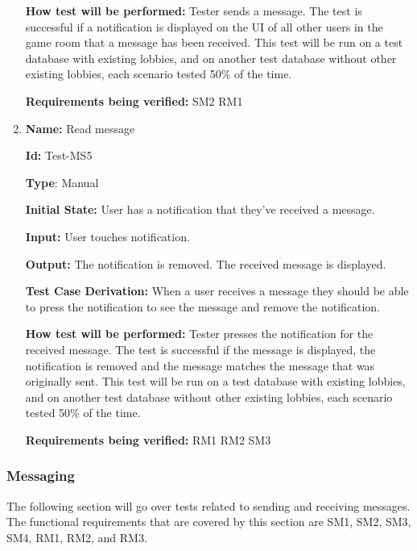 \documentclass[12pt, titlepage]{article}
\begin{document}
\begin{enumerate}
\textbf{How test will be performed:}
Tester sends a message. The test is successful if a notification is displayed on the UI of all other users in the game room that a message has been received. This test will be run on a test database with existing lobbies, and on another test database without other existing lobbies, each scenario tested 50\% of the time.

\textbf{Requirements being verified: } SM2 RM1 

\item{\textbf{Name:} Read message} \label{itm:Test-MS5}

\textbf{Id:} Test-MS5

\textbf{Type}: Manual

\textbf{Initial State:} User has a notification that they've received a message.

\textbf{Input:} User touches notification.

\textbf{Output:} The notification is removed. The received message is displayed.

\textbf{Test Case Derivation:}
When a user receives a message they should be able to press the notification to see the message and remove the notification.

\textbf{How test will be performed:}
Tester presses the notification for the received message. The test is successful if the message is displayed, the notification is removed and the message matches the message that was originally sent. This test will be run on a test database with existing lobbies, and on another test database without other existing lobbies, each scenario tested 50\% of the time.

\textbf{Requirements being verified: } RM1 RM2 SM3

\end{enumerate}

\subsubsection{Messaging}
The following section will go over tests related to sending and receiving messages. The functional requirements that are covered by this section are SM1, SM2, SM3, SM4, RM1, RM2, and RM3.
\end{document}
